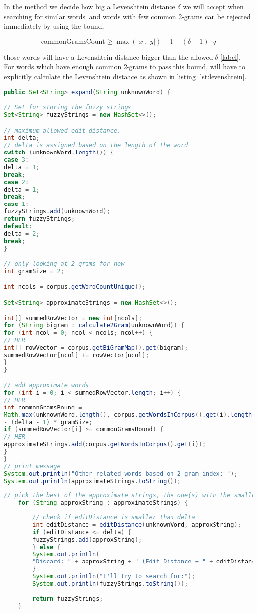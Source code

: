 In the  method we decide how big a Levenshtein distance \(\delta\) we will accept when searching for similar words, and words with few common 2-grams can be rejected immediately by using the bound,

\[ \text{commonGramsCount} \geq \max{(|x|, |y|) - 1 - (\delta -1 ) \cdot q } \]   

those words will have a Levenshtein distance bigger than the allowed \(\delta\) \ref{label}.  
For words which have enough common 2-grams to pass this bound, will have to explicitly calculate the Levenshtein distance as shown in listing \ref{lst:levenshtein}. 



\begin{lstlisting}[language=Java, caption=This is a code example., label=lst:2-gram]
public Set<String> expand(String unknownWord) {

// Set for storing the fuzzy strings
Set<String> fuzzyStrings = new HashSet<>();

// maximum allowed edit distance.
int delta;
// delta is assigned based on the length of the word
switch (unknownWord.length()) {
case 3:
delta = 1;
break;
case 2:
delta = 1;
break;
case 1:
fuzzyStrings.add(unknownWord);
return fuzzyStrings;
default:
delta = 2;
break;
}

// only looking at 2-grams for now
int gramSize = 2;

int ncols = corpus.getWordCountUnique();

Set<String> approximateStrings = new HashSet<>();

int[] summedRowVector = new int[ncols];
for (String bigram : calculate2Gram(unknownWord)) {
for (int ncol = 0; ncol < ncols; ncol++) {
// HER
int[] rowVector = corpus.getBiGramMap().get(bigram);
summedRowVector[ncol] += rowVector[ncol];
}
}

// add approximate words
for (int i = 0; i < summedRowVector.length; i++) {
// HER
int commonGramsBound =
Math.max(unknownWord.length(), corpus.getWordsInCorpus().get(i).length()) - 1
- (delta - 1) * gramSize;
if (summedRowVector[i] >= commonGramsBound) {
// HER
approximateStrings.add(corpus.getWordsInCorpus().get(i));
}
}
// print message
System.out.println("Other related words based on 2-gram index: ");
System.out.println(approximateStrings.toString());
\end{lstlisting}


\begin{lstlisting}[language=Java, caption=This is a code example., label=lst:2-gram]
	// pick the best of the approximate strings, the one(s) with the smallest edit distance.
	for (String approxString : approximateStrings) {
	
		// check if editDistance is smaller than delta
		int editDistance = editDistance(unknownWord, approxString);
		if (editDistance <= delta) {
		fuzzyStrings.add(approxString);
		} else {
		System.out.println(
		"Discard: " + approxString + " (Edit Distance = " + editDistance + " > " + delta + ")");
		}
		System.out.println("I'll try to search for:");
		System.out.println(fuzzyStrings.toString());
		
		return fuzzyStrings;
	}
\end{lstlisting}




